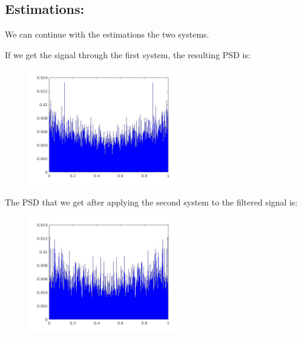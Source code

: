 \documentclass[a4paper,11pt]{article}
\begin{document}
\newpage

\subsection{Estimations:}

We can continue with the estimations the two systems.

If we get the signal through the first system, the resulting PSD is:

\begin{figure}[!hp]
    \begin{center}
    \includegraphics[width=0.6\textwidth]{images/lab4_19.jpg}
    \end{center}
\end{figure}

The PSD that we get after applying the second system to the filtered signal is:

\begin{figure}[!hp]
    \begin{center}
    \includegraphics[width=0.6\textwidth]{images/lab4_21.jpg}
    \end{center}
\end{figure}

\newpage
\end{document}
